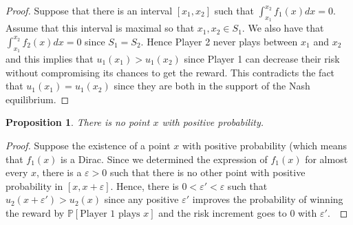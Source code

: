 \documentclass[preprint,12pt,authoryear]{elsarticle}
\newtheorem{proposition}[theorem]{Proposition}
\theoremstyle{definition}
\begin{document}
\begin{proof}
    
 Suppose that there is an interval $[x_1, x_2]$ such that $\int_{x_1}^{x_2} f_1(x) dx =0$. Assume that this interval is maximal so that $x_1, x_2 \in S_1$. We also have that $\int_{x_1}^{x_2} f_2(x) dx = 0$ since $S_1 = S_2$. Hence Player 2 never plays between $x_1$ and $x_2$ and this implies that $u_1(x_1) > u_1(x_2)$ since Player 1 can decrease their risk without compromising its chances to get the reward. This contradicts the fact that $u_1(x_1) = u_1(x_2)$ since they are both in the support of the Nash equilibrium.
\end{proof}
\begin{proposition}
There is no point $x$ with positive probability.
\end{proposition}
\begin{proof}
 Suppose the existence of a point $x$ with positive probability (which means that $f_1(x)$ is a Dirac. Since we determined the expression of $f_1(x)$ for almost every $x$, there is a $\varepsilon > 0$ such that there is no other point with positive probability in $[x, x+\varepsilon]$. Hence, there is $0 < \varepsilon' < \varepsilon$ such that $u_2(x + \varepsilon') > u_2(x)$ since any positive $\varepsilon'$ improves the probability of winning the reward by $\mathbb{P}[\text{Player 1 plays } x]$ and the risk increment goes to $0$ with $\varepsilon'$.\
\end{proof}

\nashcor*
\end{document}
